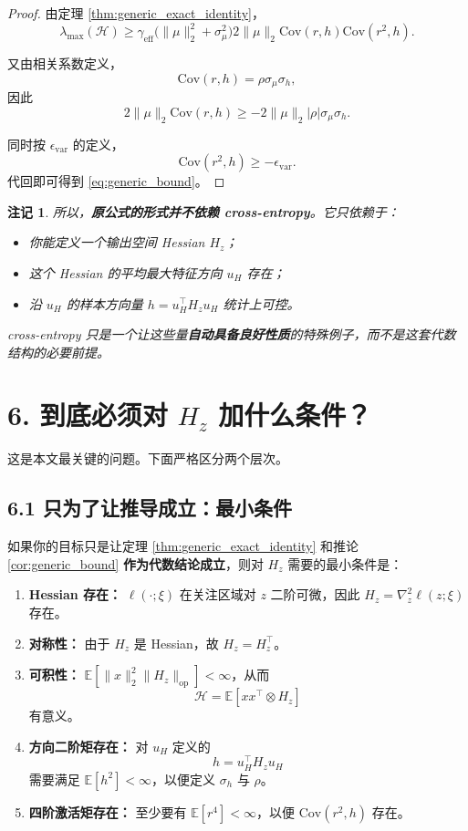 \documentclass[11pt]{ctexart}
\newtheorem{remark}{注记}
\begin{document}
\begin{proof}
由定理 \ref{thm:generic_exact_identity}，
\[
\lambda_{\max}(\mathcal{H})
\ge
\gamma_{\mathrm{eff}}\big(\|\mu\|_2^2 + \sigma_\mu^2\big)
 2\|\mu\|_2 \mathrm{Cov}(r,h)
 \mathrm{Cov}(r^2,h).
\]

又由相关系数定义，
\[
\mathrm{Cov}(r,h) = \rho \sigma_\mu \sigma_h,
\]
因此
\[
2\|\mu\|_2 \mathrm{Cov}(r,h)
\ge
-2\|\mu\|_2 |\rho| \sigma_\mu \sigma_h.
\]

同时按 $\epsilon_{\mathrm{var}}$ 的定义，
\[
\mathrm{Cov}(r^2,h) \ge -\epsilon_{\mathrm{var}}.
\]
代回即可得到 \eqref{eq:generic_bound}。
\end{proof}

\begin{remark}
所以，\textbf{原公式的形式并不依赖 cross-entropy}。它只依赖于：
\begin{itemize}
    \item 你能定义一个输出空间 Hessian $H_z$；
    \item 这个 Hessian 的平均最大特征方向 $u_H$ 存在；
    \item 沿 $u_H$ 的样本方向量 $h = u_H^\top H_z u_H$ 统计上可控。
\end{itemize}

cross-entropy 只是一个让这些量\textbf{自动具备良好性质}的特殊例子，而不是这套代数结构的必要前提。
\end{remark}

\section*{6. 到底必须对 $H_z$ 加什么条件？}

这是本文最关键的问题。下面严格区分两个层次。

\subsection*{6.1 只为了让推导成立：最小条件}

如果你的目标只是让定理 \ref{thm:generic_exact_identity} 和推论 \ref{cor:generic_bound} \textbf{作为代数结论成立}，则对 $H_z$ 需要的最小条件是：

\begin{enumerate}[label=\textbf{(M\arabic*)}]
    \item \textbf{Hessian 存在：} $\ell(\cdot;\xi)$ 在关注区域对 $z$ 二阶可微，因此 $H_z = \nabla_z^2 \ell(z;\xi)$ 存在。
    \item \textbf{对称性：} 由于 $H_z$ 是 Hessian，故 $H_z = H_z^\top$。
    \item \textbf{可积性：} $\mathbb{E}[\|x\|_2^2 \|H_z\|_{\mathrm{op}}] < \infty$，从而
    \[
    \mathcal{H} = \mathbb{E}[xx^\top \otimes H_z]
    \]
    有意义。
    \item \textbf{方向二阶矩存在：} 对 $u_H$ 定义的
    \[
    h = u_H^\top H_z u_H
    \]
    需要满足 $\mathbb{E}[h^2] < \infty$，以便定义 $\sigma_h$ 与 $\rho$。
    \item \textbf{四阶激活矩存在：} 至少要有 $\mathbb{E}[r^4] < \infty$，以便 $\mathrm{Cov}(r^2,h)$ 存在。
\end{enumerate}
\end{document}

